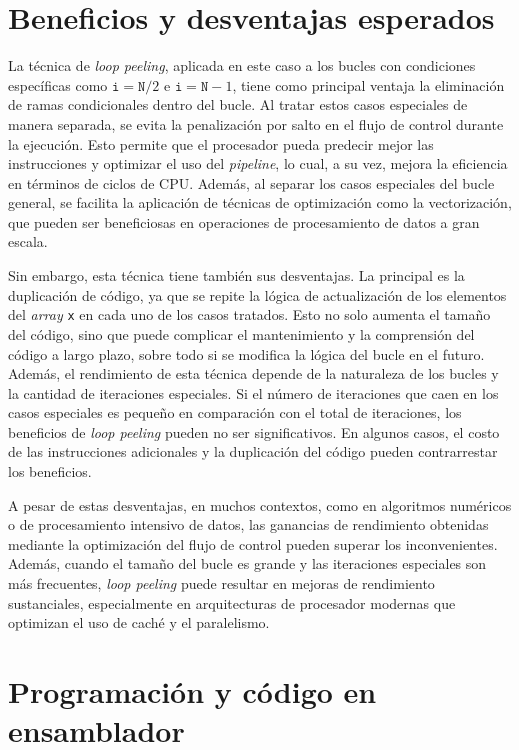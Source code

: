 \documentclass[11pt,a4paper,twoside]{article}
\theoremstyle{definition}
\begin{document}
	
	\section{Beneficios y desventajas esperados}
	
	La técnica de \textit{loop peeling}, aplicada en este caso a los bucles con condiciones específicas como $\texttt{i} = \texttt{N}/2$ e $\texttt{i} = \texttt{N} - 1$, tiene como principal ventaja la eliminación de ramas condicionales dentro del bucle. Al tratar estos casos especiales de manera separada, se evita la penalización por salto en el flujo de control durante la ejecución. Esto permite que el procesador pueda predecir mejor las instrucciones y optimizar el uso del \textit{pipeline}, lo cual, a su vez, mejora la eficiencia en términos de ciclos de CPU. Además, al separar los casos especiales del bucle general, se facilita la aplicación de técnicas de optimización como la vectorización, que pueden ser beneficiosas en operaciones de procesamiento de datos a gran escala.
	
	Sin embargo, esta técnica tiene también sus desventajas. La principal es la duplicación de código, ya que se repite la lógica de actualización de los elementos del \textit{array} \texttt{x} en cada uno de los casos tratados. Esto no solo aumenta el tamaño del código, sino que puede complicar el mantenimiento y la comprensión del código a largo plazo, sobre todo si se modifica la lógica del bucle en el futuro. Además, el rendimiento de esta técnica depende de la naturaleza de los bucles y la cantidad de iteraciones especiales. Si el número de iteraciones que caen en los casos especiales es pequeño en comparación con el total de iteraciones, los beneficios de \textit{loop peeling} pueden no ser significativos. En algunos casos, el costo de las instrucciones adicionales y la duplicación del código pueden contrarrestar los beneficios.
	
	A pesar de estas desventajas, en muchos contextos, como en algoritmos numéricos o de procesamiento intensivo de datos, las ganancias de rendimiento obtenidas mediante la optimización del flujo de control pueden superar los inconvenientes. Además, cuando el tamaño del bucle es grande y las iteraciones especiales son más frecuentes, \textit{loop peeling} puede resultar en mejoras de rendimiento sustanciales, especialmente en arquitecturas de procesador modernas que optimizan el uso de caché y el paralelismo.
	
	
	\section{Programación y código en ensamblador}
	
\end{document}
